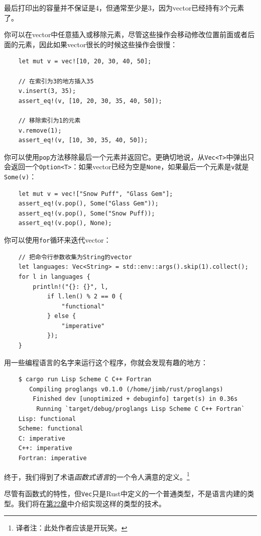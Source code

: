 最后打印出的容量并不保证是4，但通常至少是3，因为vector已经持有3个元素了。

你可以在vector中任意插入或移除元素，尽管这些操作会移动修改位置前面或者后面的元素，因此如果vector很长的时候这些操作会很慢：
\begin{verbatim}
    let mut v = vec![10, 20, 30, 40, 50];

    // 在索引为3的地方插入35
    v.insert(3, 35);
    assert_eq!(v, [10, 20, 30, 35, 40, 50]);

    // 移除索引为1的元素
    v.remove(1);
    assert_eq!(v, [10, 30, 35, 40, 50]);
\end{verbatim}

你可以使用\texttt{pop}方法移除最后一个元素并返回它。更确切地说，从\texttt{Vec<T>}中弹出只会返回一个\texttt{Option<T>}：如果vector已经为空是\texttt{None}，如果最后一个元素是\texttt{v}就是\texttt{Some(v)}：
\begin{verbatim}
    let mut v = vec!["Snow Puff", "Glass Gem"];
    assert_eq!(v.pop(), Some("Glass Gem"));
    assert_eq!(v.pop(), Some("Snow Puff));
    assert_eq!(v.pop(), None);
\end{verbatim}

你可以使用\texttt{for}循环来迭代vector：
\begin{verbatim}
    // 把命令行参数收集为String的vector
    let languages: Vec<String> = std::env::args().skip(1).collect();
    for l in languages {
        println!("{}: {}", l,
            if l.len() % 2 == 0 {
                "functional"
            } else {
                "imperative"
            });
    }
\end{verbatim}

用一些编程语言的名字来运行这个程序，你就会发现有趣的地方：
\begin{verbatim}
    $ cargo run Lisp Scheme C C++ Fortran
       Compiling proglangs v0.1.0 (/home/jimb/rust/proglangs)
        Finished dev [unoptimized + debuginfo] target(s) in 0.36s
         Running `target/debug/proglangs Lisp Scheme C C++ Fortran`
    Lisp: functional
    Scheme: functional
    C: imperative
    C++: imperative
    Fortran: imperative
\end{verbatim}

终于，我们得到了术语\emph{函数式语言}的一个令人满意的定义。\footnote{译者注：此处作者应该是开玩笑。}

尽管有函数式的特性，但\texttt{Vec}只是Rust中定义的一个普通类型，不是语言内建的类型。我们将在\hyperref[ch22]{第22章}中介绍实现这样的类型的技术。

